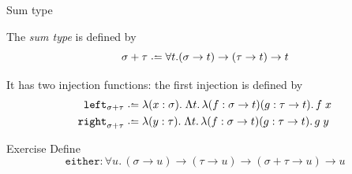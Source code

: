 \begin{frame}{Sum type}

\begin{definition}
  The \emph{sum type} is defined by
  \[
    \sigma + \tau \defeq \forall t. (\sigma \to t) \to (\tau \to t) \to t
  \]
\end{definition}
It has two injection functions: the first injection is defined by
\begin{align*}
  \mathtt{left}_{\sigma + \tau} & \defeq \lambda (x : \sigma).\;\Lambda t.\,\lambda (f : \sigma\to
  t)(g : \tau\to t).\, f\;x \\
  \mathtt{right}_{\sigma + \tau} & \defeq \lambda (y : \tau).\;\Lambda t.\,\lambda (f : \sigma\to
  t)(g : \tau\to t).\, g\;y
\end{align*}

%
%

\begin{block}{Exercise}
  Define 
  \[
    \mathtt{either} : \forall u.\, (\sigma \to u) \to (\tau \to u) \to (\sigma + \tau \to u) \to u 
  \] 
\end{block}
\end{frame}

